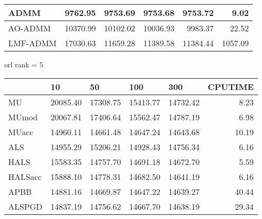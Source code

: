 \documentclass{article}
\begin{document}
\begin{table}[H]
\begin{tabular}{|l|r|r|r|r|r|}
		ADMM     & 9762.95                 & 9753.69                 & 9753.68                  & 9753.72                  & 9.02                         \\ \hline
		AO-ADMM  & 10370.99                & 10102.02                & 10036.93                 & 9983.37                  & 22.52                        \\ \hline
		LMF-ADMM & 17030.63                & 11659.28                & 11389.58                 & 11384.44                 & 1057.09                      \\ \hline
	\end{tabular}
\end{table}
 orl rank = 5
\begin{table}[H]
	\centering
	\begin{tabular}{|l|r|r|r|r|r|}
		\hline
		& \multicolumn{1}{l|}{10} & \multicolumn{1}{l|}{50} & \multicolumn{1}{l|}{100} & \multicolumn{1}{l|}{300} & \multicolumn{1}{l|}{CPUTIME} \\ \hline
		MU       & 20085.40                & 17308.75                & 15413.77                 & 14732.42                 & 8.23                         \\ \hline
		MUmod    & 20067.81                & 17406.64                & 15562.47                 & 14787.19                 & 6.98                         \\ \hline
		MUacc    & 14960.11                & 14661.48                & 14647.24                 & 14643.68                 & 10.19                        \\ \hline
		ALS      & 14955.29                & 15206.21                & 14928.43                 & 14756.34                 & 6.16                         \\ \hline
		HALS     & 15583.35                & 14757.70                & 14691.18                 & 14672.70                 & 5.59                         \\ \hline
		HALSacc  & 15888.10                & 14778.31                & 14682.50                 & 14641.19                 & 6.16                         \\ \hline
		APBB     & 14881.16                & 14669.87                & 14647.22                 & 14639.27                 & 40.44                        \\ \hline
		ALSPGD   & 14837.19                & 14756.62                & 14667.70                 & 14638.19                 & 29.34                        \\ \hline

\end{tabular}
\end{table}
\end{document}
